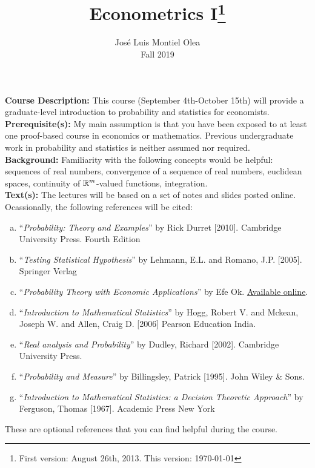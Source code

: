 \documentclass[11pt]{article}
\title {Econometrics I\thanks{First version: August 26th, 2013. This version: \today} }
\author {Jos\'e Luis Montiel Olea \protect\\
Fall 2019
}
\date{}
\begin{document}
\onehalfspace
\maketitle


\noindent \textbf{Course Description:} This course (September 4th-October 15th) will provide a graduate-level introduction to probability and statistics for economists.\\ 

\noindent \textbf{Prerequisite(s):} My main assumption is that you have been exposed to at least one proof-based course in economics or mathematics. Previous undergraduate work in probability and statistics is neither assumed nor required. \\ 

\noindent \textbf{Background:} Familiarity with the following concepts would be helpful: sequences of real numbers, convergence of a sequence of real numbers, euclidean spaces,  continuity of $\mathbb{R}^m$-valued functions, integration. \\

\noindent \textbf{Text(s):} The lectures will be based on a set of notes and slides posted online. Ocassionally, the following references will be cited:

\begin{enumerate}[a)]
\item ``\emph{Probability: Theory and Examples}'' by Rick Durret [2010]. Cambridge University Press. Fourth Edition
\item ``\emph{Testing Statistical Hypothesis}'' by Lehmann, E.L. and Romano, J.P. [2005]. Springer Verlag
\item ``\emph{Probability Theory with Economic Applications}'' by Efe Ok. \href{https://files.nyu.edu/eo1/public/books.html}{Available online}.
\item ``\emph{Introduction to Mathematical Statistics}'' by Hogg, Robert V. and Mckean, Joseph W. and Allen, Craig D. [2006] Pearson Education India. 
\item ``\emph{Real analysis and Probability}'' by Dudley, Richard [2002]. Cambridge University Press. 
\item ``\emph{Probability and Measure}'' by Billingsley, Patrick [1995]. John Wiley \& Sons. 
\item ``\emph{Introduction to Mathematical Statistics: a Decision Theoretic Approach}'' by Ferguson, Thomas [1967]. Academic Press New York
\end{enumerate}
\noindent These are optional references that you can find helpful during the course.  \\
\end{document}
